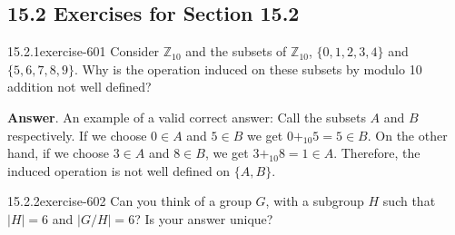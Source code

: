 \documentclass[twoside,10pt,]{book}
\numberwithin{equation}{section}
\begin{document}
\subsection*{15.2 Exercises for Section 15.2}
\begin{divisionsolution}{15.2.1}{}{exercise-601}%
\hypertarget{p-5409}{}%
Consider \(\mathbb{Z}_{10}\) and the subsets of \(\mathbb{Z}_{10}\), \(\{0, 1, 2, 3, 4\}\) and \(\{5, 6, 7, 8, 9\}\). Why is the operation induced on these subsets by modulo 10 addition not well defined?%
\par\smallskip%
\noindent\textbf{Answer}.\quad%
\hypertarget{p-5410}{}%
An example of a valid correct answer: Call the subsets \(A\) and \(B\) respectively. If we choose \(0 \in A\) and \(5 \in B\) we get \(0 +_{10} 5 =5 \in  B\). On the other hand, if we choose \(3 \in A\) and \(8 \in  B\), we get \(3 +_{10} 8 = 1 \in  A\). Therefore, the induced operation is not well defined on \(\{A,B\}\).%
\end{divisionsolution}%
\begin{divisionsolution}{15.2.2}{}{exercise-602}%
\hypertarget{p-5411}{}%
Can you think of a group \(G\), with a subgroup \(H\) such that \(\lvert H\rvert  = 6\) and \(\lvert G/H\rvert  = 6\)? Is your answer unique?%
\end{divisionsolution}%
\end{document}
